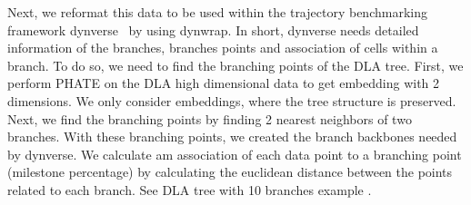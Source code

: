 Next, we reformat this data to be used within the trajectory benchmarking framework dynverse~\citep{saelens2019comparison} by using dynwrap. In short, dynverse needs detailed information of the branches, branches points and association of cells within a branch.  To do so, we need to find the branching points of the DLA tree. First, we perform PHATE on the DLA high dimensional data to get embedding with 2 dimensions. We only consider embeddings, where the tree structure is preserved. Next, we find the branching points by finding 2 nearest neighbors of two branches. With these branching points, we created the branch backbones needed by dynverse. We calculate am association of each data point to a branching point (milestone percentage) by calculating the euclidean distance between the points related to each branch. See DLA tree with 10 branches example .
